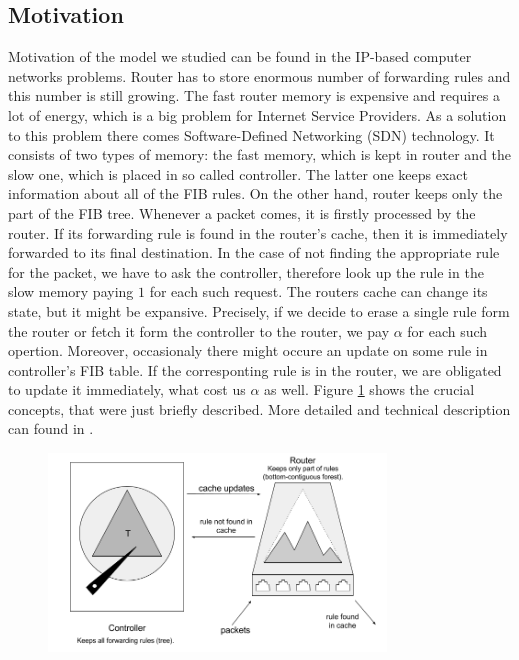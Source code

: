 \subsection{Motivation} Motivation of the model we studied can be found in the
IP-based computer networks problems. Router has to store enormous number of
forwarding rules and this number is still growing. The fast router memory is
expensive and requires a lot of energy, which is a big problem for Internet
Service Providers. As a solution to this problem there comes Software-Defined
Networking (SDN) technology. It consists of two types of memory: the fast
memory, which is kept in router and the slow one, which is placed in so called
controller. The latter one keeps exact information about all of the FIB rules.
On the other hand, router keeps only the part of the FIB tree. Whenever a packet
comes, it is firstly processed by the router. If its forwarding rule is found in
the router's cache, then it is immediately forwarded to its final destination.
In the case of not finding the appropriate rule for the packet, we have to ask
the controller, therefore look up the rule in the slow memory paying $1$ for
each such request. The routers cache can change its state, but it might be
expansive. Precisely, if we decide to erase a single rule form the router or
fetch it form the controller to the router, we pay $\alpha$ for each such
opertion.  Moreover, occasionaly there might occure an update on some rule in
controller's FIB table.  If the corresponting rule is in the router, we are
obligated to update it immediately, what cost us $\alpha$ as well. Figure
\ref{fig:motivation} shows the crucial concepts, that were just briefly
described. More detailed and technical description can found in \cite{sdn}.
\begin{figure} \begin{center}
\includegraphics[width=0.8\textwidth]{motivation.png} \end{center} \caption{}
\label{fig:motivation} \end{figure}

